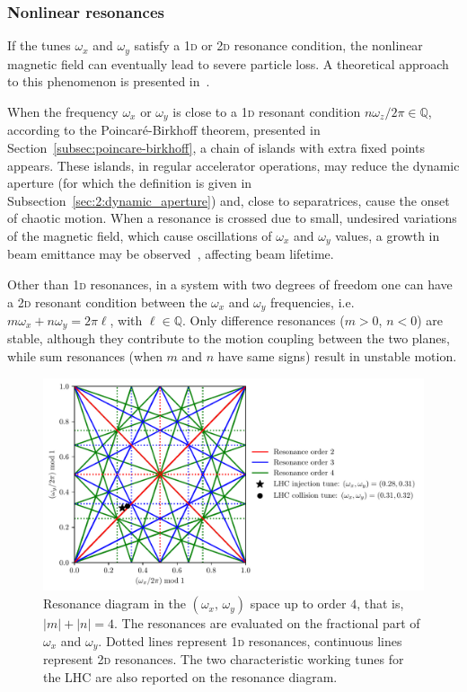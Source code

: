 \subsubsection{Nonlinear resonances}

If the tunes $\omega_x$ and $\omega_y$ satisfy a 1\textsc{d} or 2\textsc{d} resonance condition, the nonlinear magnetic field can eventually lead to severe particle loss. A theoretical approach to this phenomenon is presented in~\cite{Bazzani:262179, wilson}.

When the frequency $\omega_x$ or $\omega_y$ is close to a 1\textsc{d} resonant condition $n\omega_z / 2\pi \in \mathbb{Q}$, according to the Poincaré-Birkhoff theorem, presented in Section~\ref{subsec:poincare-birkhoff}, a chain of islands with extra fixed points appears. These islands, in regular accelerator operations, may reduce the dynamic aperture (for which the definition is given in Subsection~\ref{sec:2:dynamic_aperture}) and, close to separatrices, cause the onset of chaotic motion. When a resonance is crossed due to small, undesired variations of the magnetic field, which cause oscillations of $\omega_x$ and $\omega_y$ values, a growth in beam emittance may be observed~\cite{Guignard:185921}, affecting beam lifetime.

Other than 1\textsc{d} resonances, in a system with two degrees of freedom one can have a 2\textsc{d} resonant condition between the $\omega_x$ and $\omega_y$ frequencies, i.e.\ $m\omega_x+n\omega_y = 2\pi\ell$, with $\ell \in \mathbb{Q}$. Only difference resonances ($m>0$, $n<0$) are stable, although they contribute to the motion coupling between the two planes, while sum resonances (when $m$ and $n$ have same signs) result in unstable motion.

\begin{figure}
	\centering
	\includegraphics[width=.85\textwidth]{2_accelerator_physics_fundamentals/figs/tune_space.pdf}
	\caption{Resonance diagram in the $(\omega_x,\,\omega_y)$ space up to order $4$, that is, $|m|+|n| = 4$. The resonances are evaluated on the fractional part of $\omega_x$ and $\omega_y$. Dotted lines represent 1\textsc{d} resonances, continuous lines represent 2\textsc{d} resonances. The two characteristic working tunes for the LHC are also reported on the resonance diagram.}
	\label{fig:res}
\end{figure}


